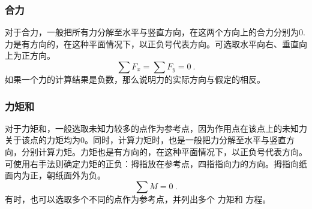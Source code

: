 \subsubsection{合力}
对于合力，一般把所有力分解至水平与竖直方向，在这两个方向上的合力分别为0. 力是有方向的，在这种平面情况下，以正负号代表方向。可选取水平向右、垂直向上为正方向。
\begin{equation}
\sum F_x=\sum F_y=0~.
\end{equation}
如果一个力的计算结果是负数，那么说明力的实际方向与假定的相反。

\subsubsection{力矩和}
对于力矩和，一般选取未知力较多的点作为参考点，因为作用点在该点上的未知力关于该点的力矩均为0。同时，计算力矩时，也是一般把力分解至水平与竖直方向，分别计算力矩。力矩也是有方向的，在这种平面情况下，以正负号代表方向。可使用右手法则确定力矩的正负：拇指放在参考点，四指指向力的方向。拇指向纸面内为正，朝纸面外为负。
\begin{equation}
\sum M=0~.
\end{equation}
有时，也可以选取多个不同的点作为参考点，并列出多个 力矩和 方程。

